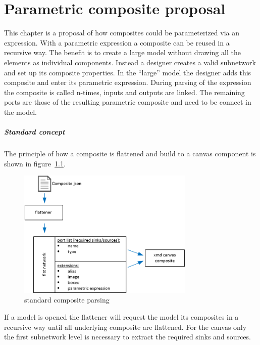 \chapter{Parametric composite proposal}

This chapter is a proposal of how composites could be parameterized via
an expression. With a parametric expression a composite can be reused in a
recursive way. The benefit is to create a large model without drawing all the
elements as individual components. Instead a designer creates a valid subnetwork
and set up its composite properties. In the ``large'' model the designer adds
this composite and enter its parametric expression. During parsing of the
expression the composite is called n-times, inputs and outputs are linked. The
remaining ports are those of the resulting parametric composite and need to be
connect in the model.

\paragraph{Standard concept}

The principle of how a composite is flattened and build to a canvas component is
shown in figure~\ref{fig:standard-composite-parsing}.

\begin{figure}[here]
\includegraphics[width=0.75\textwidth]{pictures/composite-parsing}
\caption{standard composite parsing}
\label{fig:standard-composite-parsing}
\end{figure}

If a model is opened the flattener will request the model its composites in a
recursive way until all underlying composite are flattened. For the canvas only
the first subnetwork level is necessary to extract the required sinks and
sources.

